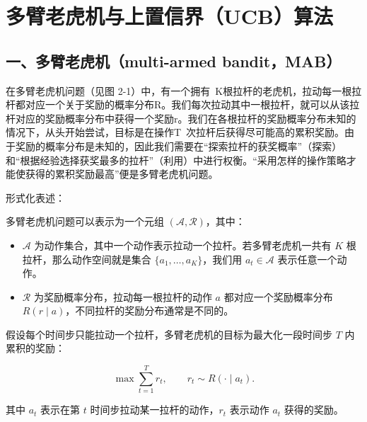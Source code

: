 \setcounter{section}{0}

\hypertarget{ux591aux81c2ux8001ux864eux673aux4e0eux4e0aux7f6eux4fe1ux754cucbux7b97ux6cd5}{%
\section{多臂老虎机与上置信界（UCB）算法}\label{ux591aux81c2ux8001ux864eux673aux4e0eux4e0aux7f6eux4fe1ux754cucbux7b97ux6cd5}}

\hypertarget{ux4e00ux591aux81c2ux8001ux864eux673amulti-armed-banditmab}{%
\subsection{一、多臂老虎机（multi-armed bandit，MAB）}\label{ux4e00ux591aux81c2ux8001ux864eux673amulti-armed-banditmab}}

在多臂老虎机问题（见图 2-1）中，有一个拥有~K根拉杆的老虎机，拉动每一根拉杆都对应一个关于奖励的概率分布R。我们每次拉动其中一根拉杆，就可以从该拉杆对应的奖励概率分布中获得一个奖励r。我们在各根拉杆的奖励概率分布未知的情况下，从头开始尝试，目标是在操作T~次拉杆后获得尽可能高的累积奖励。由于奖励的概率分布是未知的，因此我们需要在``探索拉杆的获奖概率''（探索）和``根据经验选择获奖最多的拉杆''（利用）中进行权衡。``采用怎样的操作策略才能使获得的累积奖励最高''便是多臂老虎机问题。

形式化表述：

多臂老虎机问题可以表示为一个元组 \((\mathcal{A}, \mathcal{R})\)，其中：

\begin{itemize}
\tightlist
\item
  \(\mathcal{A}\) 为动作集合，其中一个动作表示拉动一个拉杆。若多臂老虎机一共有 \(K\) 根拉杆，那么动作空间就是集合 \(\{a_1,\ldots,a_K\}\)，我们用 \(a_t \in \mathcal{A}\) 表示任意一个动作。
\item
  \(\mathcal{R}\) 为奖励概率分布，拉动每一根拉杆的动作 \(a\) 都对应一个奖励概率分布 \(R(r\mid a)\)，不同拉杆的奖励分布通常是不同的。
\end{itemize}

假设每个时间步只能拉动一个拉杆，多臂老虎机的目标为最大化一段时间步 \(T\) 内累积的奖励：

\[
\max \sum_{t=1}^{T} r_t,\qquad r_t \sim R(\cdot\mid a_t).
\]

其中 \(a_t\) 表示在第 \(t\) 时间步拉动某一拉杆的动作，\(r_t\) 表示动作 \(a_t\) 获得的奖励。


